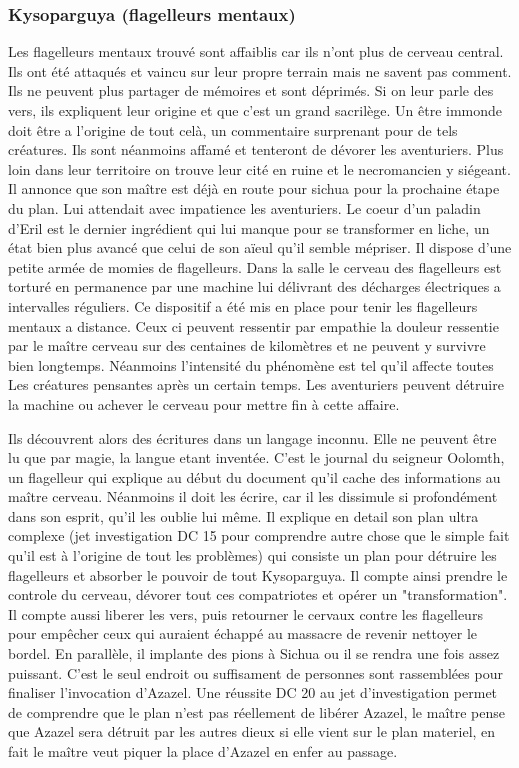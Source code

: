 \subsubsection*{Kysoparguya (flagelleurs mentaux)}

Les flagelleurs mentaux trouvé sont affaiblis car ils n'ont plus de cerveau 
central. Ils ont été attaqués et vaincu sur leur propre terrain mais ne savent 
pas comment. Ils ne peuvent plus partager de mémoires et sont déprimés. Si on 
leur parle des vers, ils expliquent leur origine et que c'est un grand sacrilège. 
Un être immonde doit être a l'origine de tout celà, un commentaire surprenant 
pour de tels créatures. Ils sont néanmoins affamé et tenteront de dévorer les 
aventuriers. Plus loin dans leur territoire on trouve leur cité en ruine et le 
necromancien y siégeant. Il annonce que son maître est déjà en route pour sichua 
pour la prochaine étape du plan. Lui attendait avec impatience les aventuriers. 
Le coeur d'un paladin d'Eril est le dernier ingrédient qui lui manque pour se 
transformer en liche, un état bien plus avancé que celui de son aïeul qu'il semble 
mépriser. Il dispose d'une petite armée de momies de flagelleurs. Dans la salle 
le cerveau des flagelleurs est torturé en permanence par une machine lui délivrant 
des décharges électriques a intervalles réguliers. Ce dispositif a été mis en place 
pour tenir les flagelleurs mentaux a distance. Ceux ci peuvent ressentir par 
empathie la douleur ressentie par le maître cerveau sur des centaines de kilomètres 
et ne peuvent y survivre bien longtemps. Néanmoins l'intensité du phénomène est tel 
qu'il affecte toutes Les créatures pensantes après un certain temps. Les aventuriers 
peuvent détruire la machine ou achever le cerveau pour mettre fin à cette affaire.

Ils découvrent alors des écritures dans un langage inconnu. Elle ne peuvent être 
lu que par magie, la langue etant inventée. C'est le journal du seigneur Oolomth,
un flagelleur qui explique au début du document qu'il cache des informations au
maître cerveau. Néanmoins il doit les écrire, car il les dissimule si profondément
dans son esprit, qu'il les oublie lui même. Il explique en detail son plan ultra
complexe (jet investigation DC 15 pour comprendre autre chose que le simple fait 
qu'il est à l'origine de tout les problèmes) qui consiste un plan pour détruire
les flagelleurs et absorber le pouvoir de tout Kysoparguya. Il compte ainsi prendre 
le controle du cerveau, dévorer tout ces compatriotes et opérer un "transformation".
Il compte aussi liberer les vers, puis
retourner le cervaux contre les flagelleurs pour empêcher ceux qui auraient échappé 
au massacre de revenir nettoyer le bordel. En parallèle, il implante des pions
à Sichua ou il se rendra une fois assez puissant. C'est le seul endroit ou suffisament 
de personnes sont rassemblées pour finaliser l'invocation d'Azazel. Une réussite 
DC 20 au jet d'investigation permet de comprendre que le plan n'est pas réellement
de libérer Azazel, le maître pense que Azazel sera détruit par les autres dieux si 
elle vient sur le plan materiel, en fait le maître veut  piquer la place d'Azazel en 
enfer au passage.

